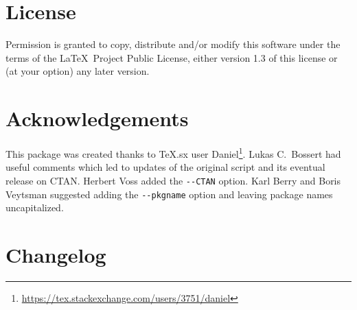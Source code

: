 \documentclass[11pt]{ltxdoc}
\begin{document}
\section{License}

Permission is granted to copy, distribute and/or modify this software
under the terms of the \LaTeX\ Project Public License, either version 1.3
of this license or (at your option) any later version.

\section{Acknowledgements}

This package was created thanks to TeX.sx user
Daniel\footnote{\url{https://tex.stackexchange.com/users/3751/daniel}}.
Lukas C.~Bossert had useful comments which led to updates of the original
script and its eventual release on CTAN. Herbert Voss added the
\verb|--CTAN| option. Karl Berry and Boris Veytsman suggested adding the
\verb|--pkgname| option and leaving package names uncapitalized.

\newpage
\section{Changelog}
\end{document}
